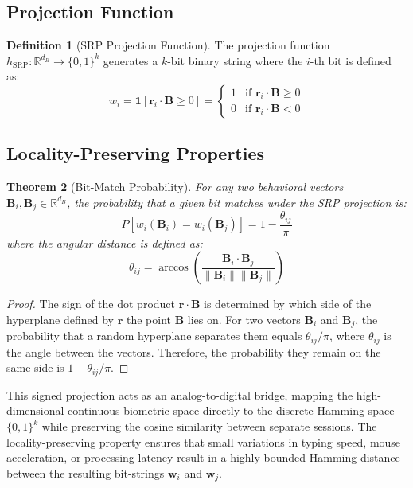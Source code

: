 \documentclass[11pt,twoside]{amsart}
\theoremstyle{plain}
\newtheorem{theorem}{Theorem}[section]
\theoremstyle{definition}
\newtheorem{definition}[theorem]{Definition}
\theoremstyle{remark}
\newcommand{\indicator}{\mathbf{1}}
\newcommand{\bB}{\mathbf{B}}
\newcommand{\bw}{\mathbf{w}}
\newcommand{\br}{\mathbf{r}}
\newcommand{\bbR}{\mathbb{R}}
\newcommand{\indicator}{\mathbbm{1}}
\begin{document}
\subsection{Projection Function}

\begin{definition}[SRP Projection Function]
\label{def:projection}
The projection function $h_{\text{SRP}}: \bbR^{d_B} \rightarrow \{0, 1\}^k$ generates a $k$-bit binary string where the $i$-th bit is defined as:
\begin{equation}
w_i = \indicator[\br_i \cdot \bB \geq 0] = 
\begin{cases} 
1 & \text{if } \br_i \cdot \bB \geq 0 \\
0 & \text{if } \br_i \cdot \bB < 0 
\end{cases}
\end{equation}
\end{definition}

\subsection{Locality-Preserving Properties}

\begin{theorem}[Bit-Match Probability]
\label{thm:bitmatch}
For any two behavioral vectors $\bB_i, \bB_j \in \bbR^{d_B}$, the probability that a given bit matches under the SRP projection is:
\begin{equation}
P[w_i(\bB_i) = w_i(\bB_j)] = 1 - \frac{\theta_{ij}}{\pi}
\end{equation}
where the angular distance is defined as:
\begin{equation}
\theta_{ij} = \arccos\left(\frac{\bB_i \cdot \bB_j}{\|\bB_i\| \|\bB_j\|}\right)
\end{equation}
\end{theorem}

\begin{proof}
The sign of the dot product $\br \cdot \bB$ is determined by which side of the hyperplane defined by $\br$ the point $\bB$ lies on. For two vectors $\bB_i$ and $\bB_j$, the probability that a random hyperplane separates them equals $\theta_{ij}/\pi$, where $\theta_{ij}$ is the angle between the vectors. Therefore, the probability they remain on the same side is $1 - \theta_{ij}/\pi$.
\end{proof}

This signed projection acts as an analog-to-digital bridge, mapping the high-dimensional continuous biometric space directly to the discrete Hamming space $\{0, 1\}^k$ while preserving the cosine similarity between separate sessions. The locality-preserving property ensures that small variations in typing speed, mouse acceleration, or processing latency result in a highly bounded Hamming distance between the resulting bit-strings $\bw_i$ and $\bw_j$.
\end{document}
